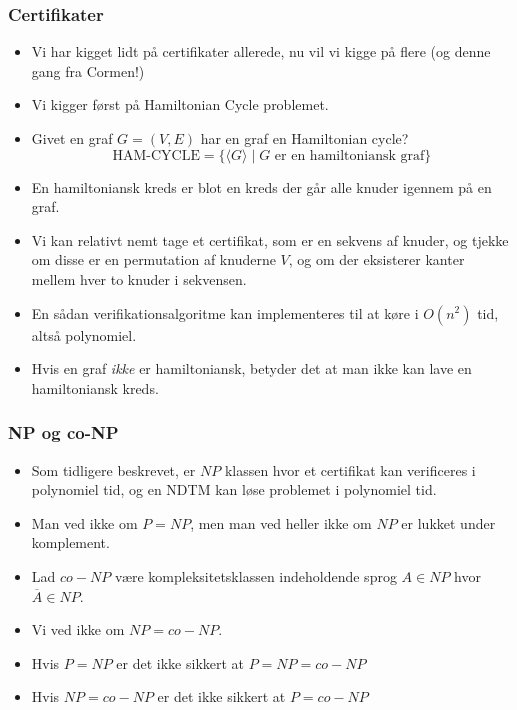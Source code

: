 \begin{frame}[allowframebreaks]
	\frametitle{Certifikater}
	\begin{itemize}
		\item Vi har kigget lidt på certifikater allerede, nu vil vi kigge på flere (og denne gang fra Cormen!)
		\item Vi kigger først på Hamiltonian Cycle problemet.
		\item Givet en graf $G = (V,E)$ har en graf en Hamiltonian cycle?
		      \begin{equation}
			      \text{HAM-CYCLE} = \{\langle G \rangle \mid G \text{ er en hamiltoniansk graf}\}
		      \end{equation}


		\item En hamiltoniansk kreds er blot en kreds der går alle knuder igennem på en graf.
		\item Vi kan relativt nemt tage et certifikat, som er en sekvens af knuder, og tjekke om disse er en permutation af knuderne $V$, og om der eksisterer kanter mellem hver to knuder i sekvensen.
		\item En sådan verifikationsalgoritme kan implementeres til at køre i $O(n^{2})$ tid, altså polynomiel.
		\item Hvis en graf \textit{ikke} er hamiltoniansk, betyder det at man ikke kan lave en hamiltoniansk kreds.
	\end{itemize}
\end{frame}

\begin{frame}[allowframebreaks]
	\frametitle{NP og co-NP}

	\begin{itemize}
		\item Som tidligere beskrevet, er $NP$ klassen hvor et certifikat kan verificeres i polynomiel tid, og en NDTM kan løse problemet i polynomiel tid.
		\item Man ved ikke om $P = NP$, men man ved heller ikke om $NP$ er lukket under komplement.
		\item Lad $co-NP$ være kompleksitetsklassen indeholdende sprog $A \in NP$ hvor $\overline{A} \in NP$.
		\item Vi ved ikke om $NP = co-NP$.
		\item Hvis $P = NP$ er det ikke sikkert at $P = NP = co-NP$
		\item Hvis $NP = co-NP$ er det ikke sikkert at $P = co-NP$
	\end{itemize}
\end{frame}


